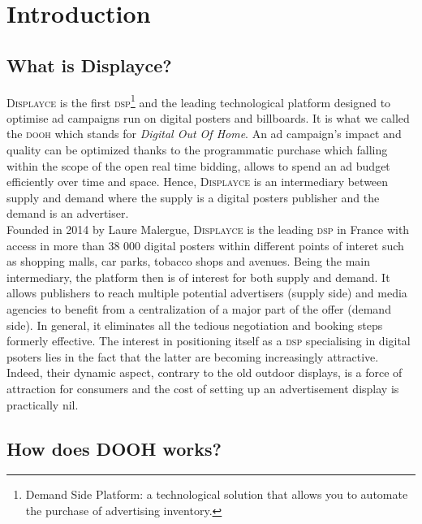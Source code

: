 \documentclass[12pt]{article}
\newcommand{\disp}{\textsc{Displayce}\xspace}
\begin{document}
\section{Introduction}

\subsection{What is Displayce?}

\disp is the first \textsc{dsp}\footnote{Demand Side Platform: a technological solution that allows you to automate the purchase of advertising inventory.} and the leading technological platform designed to optimise ad campaigns run on digital posters and billboards. It is what we called the \textsc{dooh} which stands for \emph{Digital Out Of Home}. An ad campaign's impact and quality can be optimized thanks to the programmatic purchase which falling within the scope of the open real time bidding, allows to spend an ad budget efficiently over time and space. Hence, \disp is an intermediary between supply and demand where the supply is a digital posters publisher and the demand is an advertiser. \\

Founded in 2014 by Laure Malergue, \disp is the leading \textsc{dsp} in France with access in more than 38 000 digital posters within different points of interet such as shopping malls, car parks, tobacco shops and avenues. Being the main intermediary, the platform then is of interest for both supply and demand. It allows publishers to reach multiple potential advertisers (supply side) and media agencies to benefit from a centralization of a major part of the offer (demand side). In general, it eliminates all the tedious negotiation and booking steps formerly effective. The interest in positioning itself as a \textsc{dsp} specialising in digital psoters lies in the fact that the latter are becoming increasingly attractive. Indeed, their dynamic aspect, contrary to the old outdoor displays, is a force of attraction for consumers and the cost of setting up an advertisement display is practically nil. \\

\subsection{How does DOOH works?}
\end{document}
